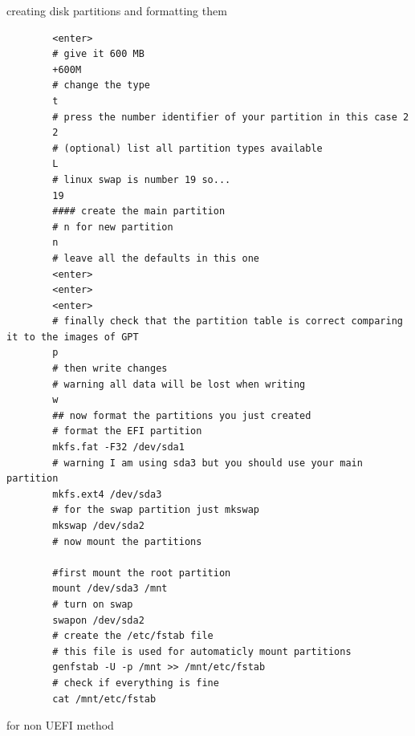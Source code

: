 \begin{section}{creating disk partitions and formatting them}
\begin{verbatim}
		<enter>
		# give it 600 MB
		+600M
		# change the type
		t
		# press the number identifier of your partition in this case 2
		2
		# (optional) list all partition types available
		L
		# linux swap is number 19 so...
		19
		#### create the main partition
		# n for new partition
		n
		# leave all the defaults in this one
		<enter>
		<enter>
		<enter>
		# finally check that the partition table is correct comparing it to the images of GPT
		p
		# then write changes
		# warning all data will be lost when writing
		w
		## now format the partitions you just created
		# format the EFI partition
		mkfs.fat -F32 /dev/sda1
		# warning I am using sda3 but you should use your main partition
		mkfs.ext4 /dev/sda3
		# for the swap partition just mkswap
		mkswap /dev/sda2
		# now mount the partitions

		#first mount the root partition
		mount /dev/sda3 /mnt
		# turn on swap
		swapon /dev/sda2
		# create the /etc/fstab file
		# this file is used for automaticly mount partitions 
		genfstab -U -p /mnt >> /mnt/etc/fstab
		# check if everything is fine 
		cat /mnt/etc/fstab
	\end{verbatim}
	\begin{Large}
		for non UEFI method
	\end{Large}
\end{section}
\newpage

